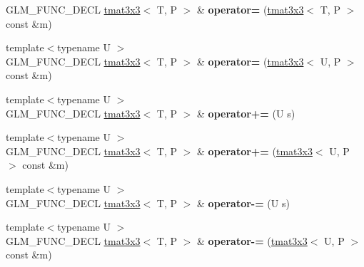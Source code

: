 \begin{DoxyCompactItemize}
\item 
G\+L\+M\+\_\+\+F\+U\+N\+C\+\_\+\+D\+E\+CL \hyperlink{structglm_1_1detail_1_1tmat3x3}{tmat3x3}$<$ T, P $>$ \& {\bfseries operator=} (\hyperlink{structglm_1_1detail_1_1tmat3x3}{tmat3x3}$<$ T, P $>$ const \&m)\hypertarget{structglm_1_1detail_1_1tmat3x3_a7b73504291487e21519005578c6a900b}{}\label{structglm_1_1detail_1_1tmat3x3_a7b73504291487e21519005578c6a900b}

\item 
{\footnotesize template$<$typename U $>$ }\\G\+L\+M\+\_\+\+F\+U\+N\+C\+\_\+\+D\+E\+CL \hyperlink{structglm_1_1detail_1_1tmat3x3}{tmat3x3}$<$ T, P $>$ \& {\bfseries operator=} (\hyperlink{structglm_1_1detail_1_1tmat3x3}{tmat3x3}$<$ U, P $>$ const \&m)\hypertarget{structglm_1_1detail_1_1tmat3x3_a0b69c604eee9037a4b3ad45290e8d2ed}{}\label{structglm_1_1detail_1_1tmat3x3_a0b69c604eee9037a4b3ad45290e8d2ed}

\item 
{\footnotesize template$<$typename U $>$ }\\G\+L\+M\+\_\+\+F\+U\+N\+C\+\_\+\+D\+E\+CL \hyperlink{structglm_1_1detail_1_1tmat3x3}{tmat3x3}$<$ T, P $>$ \& {\bfseries operator+=} (U s)\hypertarget{structglm_1_1detail_1_1tmat3x3_a691337477f60d50bcdef7ae0372b1f06}{}\label{structglm_1_1detail_1_1tmat3x3_a691337477f60d50bcdef7ae0372b1f06}

\item 
{\footnotesize template$<$typename U $>$ }\\G\+L\+M\+\_\+\+F\+U\+N\+C\+\_\+\+D\+E\+CL \hyperlink{structglm_1_1detail_1_1tmat3x3}{tmat3x3}$<$ T, P $>$ \& {\bfseries operator+=} (\hyperlink{structglm_1_1detail_1_1tmat3x3}{tmat3x3}$<$ U, P $>$ const \&m)\hypertarget{structglm_1_1detail_1_1tmat3x3_a2e5ebe3eeb51b9e64924b818b7a7cd0d}{}\label{structglm_1_1detail_1_1tmat3x3_a2e5ebe3eeb51b9e64924b818b7a7cd0d}

\item 
{\footnotesize template$<$typename U $>$ }\\G\+L\+M\+\_\+\+F\+U\+N\+C\+\_\+\+D\+E\+CL \hyperlink{structglm_1_1detail_1_1tmat3x3}{tmat3x3}$<$ T, P $>$ \& {\bfseries operator-\/=} (U s)\hypertarget{structglm_1_1detail_1_1tmat3x3_a4ee83a0dd2a65d7e90b9b21479eee52a}{}\label{structglm_1_1detail_1_1tmat3x3_a4ee83a0dd2a65d7e90b9b21479eee52a}

\item 
{\footnotesize template$<$typename U $>$ }\\G\+L\+M\+\_\+\+F\+U\+N\+C\+\_\+\+D\+E\+CL \hyperlink{structglm_1_1detail_1_1tmat3x3}{tmat3x3}$<$ T, P $>$ \& {\bfseries operator-\/=} (\hyperlink{structglm_1_1detail_1_1tmat3x3}{tmat3x3}$<$ U, P $>$ const \&m)\hypertarget{structglm_1_1detail_1_1tmat3x3_acbadd4964bdf31cdd701bd509b8bad03}{}\label{structglm_1_1detail_1_1tmat3x3_acbadd4964bdf31cdd701bd509b8bad03}


\end{DoxyCompactItemize}
